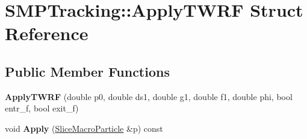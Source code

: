 \hypertarget{structSMPTracking_1_1ApplyTWRF}{}\section{S\+M\+P\+Tracking\+:\+:Apply\+T\+W\+RF Struct Reference}
\label{structSMPTracking_1_1ApplyTWRF}
\subsection*{Public Member Functions}
\begin{DoxyCompactItemize}
\item 
\mbox{\label{structSMPTracking_1_1ApplyTWRF_a5f52dc63feb4253d6ee5b1b2fc8a4572}} 
{\bfseries Apply\+T\+W\+RF} (double p0, double ds1, double g1, double f1, double phi, bool entr\+\_\+f, bool exit\+\_\+f)
\item 
\mbox{\label{structSMPTracking_1_1ApplyTWRF_a788333f0fc4abfa7a708bcd558346b84}} 
void {\bfseries Apply} (\hyperlink{classSMPTracking_1_1SliceMacroParticle}{Slice\+Macro\+Particle} \&p) const
\end{DoxyCompactItemize}
